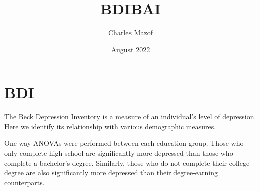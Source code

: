 \documentclass{article}
\title{BDIBAI}
\author{Charles Mazof}
\date{August 2022}
\begin{document}
\maketitle

\section{BDI}

The Beck Depression Inventory is a measure of an individual's level of depression. Here we identify its relationship with various demographic measures.

One-way ANOVAs were performed between each education group. Those who only complete high school are significantly more depressed than those who complete a bachelor's degree. Similarly, those who do not complete their college degree are also significantly more depressed than their degree-earning counterparts.
\end{document}
